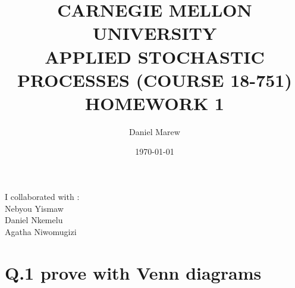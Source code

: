 \documentclass[a4paper,11pt]{report}
\begin{document}
\title{\color{red}CARNEGIE MELLON UNIVERSITY\\
APPLIED STOCHASTIC PROCESSES  (COURSE 18-751)\\
HOMEWORK 1}
\author{Daniel Marew}
\date{\today}


\maketitle
I collaborated with :\\
\hspace*{6cm}
Nebyou Yismaw\\
\hspace*{6cm}
Daniel    Nkemelu\\
\hspace*{6cm}
Agatha Niwomugizi
\newpage
\section*{Q.1 prove with Venn diagrams}
\end{document}
